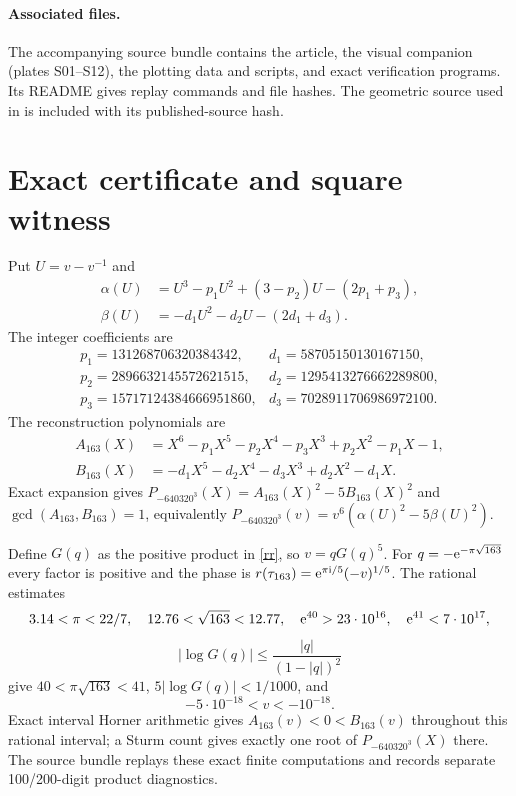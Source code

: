 \documentclass[11pt]{article}
\begin{document}
\paragraph{Associated files.}
The accompanying source bundle contains the article, the visual companion
(plates S01--S12), the plotting data and scripts, and exact verification
programs. Its README gives replay commands and file hashes. The geometric
source used in \cite{HMR} is included with its published-source hash.

\appendix
\section{Exact certificate and square witness}\label{certificate}
Put $U=v-v^{-1}$ and
\begin{align*}
\alpha(U)&=U^3-p_1U^2+(3-p_2)U-(2p_1+p_3),\\
\beta(U)&=-d_1U^2-d_2U-(2d_1+d_3).
\end{align*}
The integer coefficients are
\[
\begin{array}{ll}
p_1=131268706320384342,&d_1=58705150130167150,\\
p_2=2896632145572621515,&d_2=1295413276662289800,\\
p_3=15717124384666951860,&d_3=7028911706986972100.
\end{array}
\]
The reconstruction polynomials are
\begin{align*}
A_{163}(X)&=X^6-p_1X^5-p_2X^4-p_3X^3+p_2X^2-p_1X-1,\\
B_{163}(X)&=-d_1X^5-d_2X^4-d_3X^3+d_2X^2-d_1X.
\end{align*}
Exact expansion gives
$P_{-640320^3}(X)=A_{163}(X)^2-5B_{163}(X)^2$ and
$\gcd(A_{163},B_{163})=1$, equivalently
$P_{-640320^3}(v)=v^6(\alpha(U)^2-5\beta(U)^2)$.

Define $G(q)$ as the positive product in \eqref{rr}, so $v=qG(q)^5$.
For $q=-\mathrm e^{-\pi\sqrt{163}}$ every factor is positive and the phase is
$r(\tau_{163})=\mathrm e^{\pi\mathrm i/5}(-v)^{1/5}$.  The rational estimates
\[
3.14<\pi<22/7,\quad12.76<\sqrt{163}<12.77,\quad
\mathrm e^{40}>23\cdot10^{16},\quad\mathrm e^{41}<7\cdot10^{17},
\]
\[
|\log G(q)|\le \frac{|q|}{(1-|q|)^2}
\]
give $40<\pi\sqrt{163}<41$, $5|\log G(q)|<1/1000$, and
\[
-5\cdot10^{-18}<v<-10^{-18}.
\]
Exact interval Horner arithmetic gives $A_{163}(v)<0<B_{163}(v)$
throughout this rational interval; a Sturm count gives exactly one root of
$P_{-640320^3}(X)$ there. The source bundle replays these exact finite
computations and records separate 100/200-digit product diagnostics.
\end{document}
